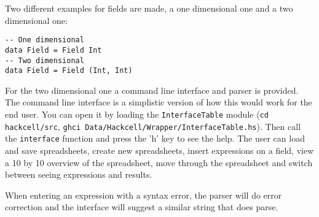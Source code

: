 \documentclass{article}
\begin{document}
	Two different examples for fields are made, a one dimensional one and a two dimensional one:
\begin{verbatim}
-- One dimensional
data Field = Field Int
-- Two dimensional
data Field = Field (Int, Int)
\end{verbatim}
	
	For the two dimensional one a command line interface and parser is provided. The command line interface is a simplistic version of how this would work for the end user. You can open it by loading the \texttt{InterfaceTable} module (\texttt{cd hackcell/src}, \texttt{ghci Data/Hackcell/Wrapper/InterfaceTable.hs}). Then call the \texttt{interface} function and press the 'h' key to see the help. The user can load and save spreadsheets, create new spreadsheets, insert expressions on a field, view a 10 by 10 overview of the spreadsheet, move through the spreadsheet and switch between seeing expressions and results.
	
	When entering an expression with a syntax error, the parser will do error correction and the interface will suggest a similar string that does parse.
\end{document}
